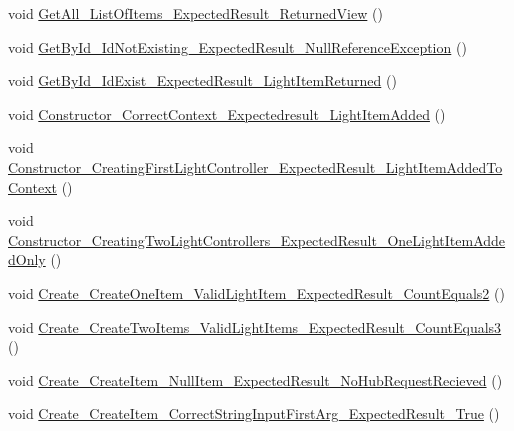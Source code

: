 \begin{DoxyCompactItemize}
void \mbox{\hyperlink{class_web_api_1_1_unit_1_1_test_1_1_u_t___light_controller_a6f5ac7294baadd445c693f89a123aba9}{Get\+All\+\_\+\+List\+Of\+Items\+\_\+\+Expected\+Result\+\_\+\+Returned\+View}} ()
\item 
void \mbox{\hyperlink{class_web_api_1_1_unit_1_1_test_1_1_u_t___light_controller_aeccb67247f1ba2ef7bfe0b575ba40130}{Get\+By\+Id\+\_\+\+Id\+Not\+Existing\+\_\+\+Expected\+Result\+\_\+\+Null\+Reference\+Exception}} ()
\item 
void \mbox{\hyperlink{class_web_api_1_1_unit_1_1_test_1_1_u_t___light_controller_ad70fd1c9953fbf701b43e2396e05d32d}{Get\+By\+Id\+\_\+\+Id\+Exist\+\_\+\+Expected\+Result\+\_\+\+Light\+Item\+Returned}} ()
\item 
void \mbox{\hyperlink{class_web_api_1_1_unit_1_1_test_1_1_u_t___light_controller_aee4ee9adb8a0b1018dffbe709bd68e2a}{Constructor\+\_\+\+Correct\+Context\+\_\+\+Expectedresult\+\_\+\+Light\+Item\+Added}} ()
\item 
void \mbox{\hyperlink{class_web_api_1_1_unit_1_1_test_1_1_u_t___light_controller_a4d9b7a7e09da979d8feb98f4dbe4a10a}{Constructor\+\_\+\+Creating\+First\+Light\+Controller\+\_\+\+Expected\+Result\+\_\+\+Light\+Item\+Added\+To\+Context}} ()
\item 
void \mbox{\hyperlink{class_web_api_1_1_unit_1_1_test_1_1_u_t___light_controller_ae0d32217f4e0806eee274d64d9bf9fd4}{Constructor\+\_\+\+Creating\+Two\+Light\+Controllers\+\_\+\+Expected\+Result\+\_\+\+One\+Light\+Item\+Added\+Only}} ()
\item 
void \mbox{\hyperlink{class_web_api_1_1_unit_1_1_test_1_1_u_t___light_controller_ad8462e1a8991ef7f7ea86a852fb5a22f}{Create\+\_\+\+Create\+One\+Item\+\_\+\+Valid\+Light\+Item\+\_\+\+Expected\+Result\+\_\+\+Count\+Equals2}} ()
\item 
void \mbox{\hyperlink{class_web_api_1_1_unit_1_1_test_1_1_u_t___light_controller_a91f280bc4d645889a5a04a91d88946d7}{Create\+\_\+\+Create\+Two\+Items\+\_\+\+Valid\+Light\+Items\+\_\+\+Expected\+Result\+\_\+\+Count\+Equals3}} ()
\item 
void \mbox{\hyperlink{class_web_api_1_1_unit_1_1_test_1_1_u_t___light_controller_aa2946b0557910db95f1f331365538300}{Create\+\_\+\+Create\+Item\+\_\+\+Null\+Item\+\_\+\+Expected\+Result\+\_\+\+No\+Hub\+Request\+Recieved}} ()
\item 
void \mbox{\hyperlink{class_web_api_1_1_unit_1_1_test_1_1_u_t___light_controller_a26222d9e22868156c9d6002e4046d7d0}{Create\+\_\+\+Create\+Item\+\_\+\+Correct\+String\+Input\+First\+Arg\+\_\+\+Expected\+Result\+\_\+\+True}} ()

\end{DoxyCompactItemize}

